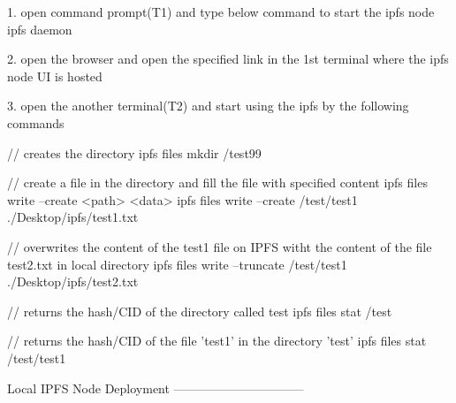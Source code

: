 1. open command prompt(T1) and type below command to start the ipfs node
ipfs daemon

2. open the browser and open the specified link in the 1st terminal where the ipfs node UI is hosted

3. open the another terminal(T2) and start using the ipfs by the following commands


// creates the directory
ipfs files mkdir /test99

// create a file in the directory and fill the file with specified content
ipfs files write --create  <path> <data>   
ipfs files write --create /test/test1 ./Desktop/ipfs/test1.txt

// overwrites the content of the test1 file on IPFS witht the content of the file test2.txt in local directory
ipfs files write --truncate /test/test1 ./Desktop/ipfs/test2.txt

// returns the hash/CID of the directory called test
ipfs files stat /test

// returns the hash/CID of the file 'test1' in the directory 'test'
ipfs files stat /test/test1


Local IPFS Node Deployment
--------------------------------